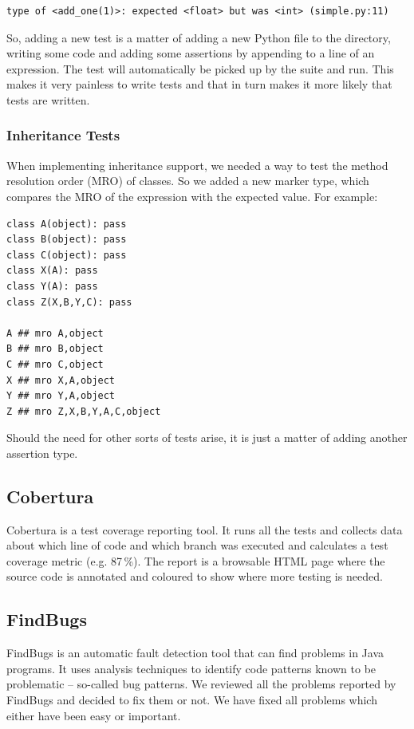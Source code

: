 \documentclass[12pt,halfparskip,DIV11,BCOR10mm]{scrreprt}
\begin{document}
\begin{verbatim}
type of <add_one(1)>: expected <float> but was <int> (simple.py:11)
\end{verbatim}

So, adding a new test is a matter of adding a new Python file to the directory, writing some code and adding some assertions by appending  to a line of an expression. The test will automatically be picked up by the suite and run. This makes it very painless to write tests and that in turn makes it more likely that tests are written.

\subsubsection{Inheritance Tests}

When implementing inheritance support, we needed a way to test the method resolution order (MRO) of classes. So we added a new marker type,  which compares the MRO of the expression with the expected value. For example:

\begin{lstlisting}
class A(object): pass
class B(object): pass
class C(object): pass
class X(A): pass
class Y(A): pass
class Z(X,B,Y,C): pass

A ## mro A,object
B ## mro B,object
C ## mro C,object
X ## mro X,A,object
Y ## mro Y,A,object
Z ## mro Z,X,B,Y,A,C,object
\end{lstlisting}

Should the need for other sorts of tests arise, it is just a matter of adding another assertion type.

\subsection{Cobertura}

Cobertura is a test coverage reporting tool. It runs all the tests and collects data about which line of code and which branch was executed and calculates a test coverage metric (e.g. 87\,\%). The report is a browsable HTML page where the source code is annotated and coloured to show where more testing is needed.

\subsection{FindBugs}

FindBugs is an automatic fault detection tool that can find problems in Java programs. It uses analysis techniques to identify code patterns known to be problematic – so-called bug patterns. We reviewed all the problems reported by FindBugs and decided to fix them or not. We have fixed all problems which either have been easy or important.
\end{document}
